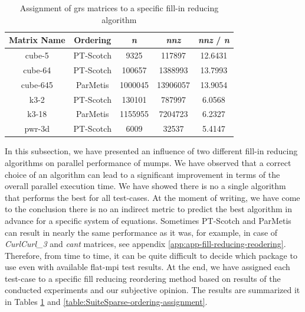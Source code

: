 \begin{table}[htpb]
\centering
\begin{tabular}{|c|c|c|c|c|}
\hline
Matrix Name & Ordering  & \textit{n}       & \textit{nnz}      & \textit{nnz} / \textit{n} \\ \hline
cube-5      & PT-Scotch & 9325    & 117897   & 12.6431 \\ \hline
cube-64     & PT-Scotch & 100657  & 1388993  & 13.7993 \\ \hline
cube-645    & ParMetis  & 1000045 & 13906057 & 13.9054 \\ \hline
k3-2        & PT-Scotch & 130101  & 787997   & 6.0568  \\ \hline
k3-18       & ParMetis  & 1155955 & 7204723  & 6.2327  \\ \hline
pwr-3d      & PT-Scotch & 6009    & 32537    & 5.4147  \\ \hline
\end{tabular}
\caption{Assignment of \acrshort{grs} matrices to a specific fill-in reducing algorithm}
\label{table:GRS-ordering-assignment}
\end{table}


In this subsection, we have presented an influence of  two different fill-in reducing algorithms on parallel performance of \acrshort{mumps}. We have observed that a correct choice of an algorithm can lead to a significant improvement in terms of the overall parallel execution time. We have showed there is no a single algorithm that performs the best for all test-cases. At the moment of writing, we have come to the conclusion there is no an indirect metric to predict the best algorithm in advance for a specific system of equations. Sometimes PT-Scotch and ParMetis can result in nearly the same performance as it was, for example, in case of \textit{CurlCurl\_3} and \textit{cant} matrices, see appendix \ref{app:app-fill-reducing-reodering}. Therefore, from time to time, it can be quite difficult to decide which package to use even with available flat-\acrshort{mpi} test results. At the end, we have assigned each test-case to a specific fill reducing reordering method based on results of the conducted experiments and our subjective opinion. The results are summarized it in Tables \ref{table:GRS-ordering-assignment} and \ref{table:SuiteSparse-ordering-assignment}. \\ 



